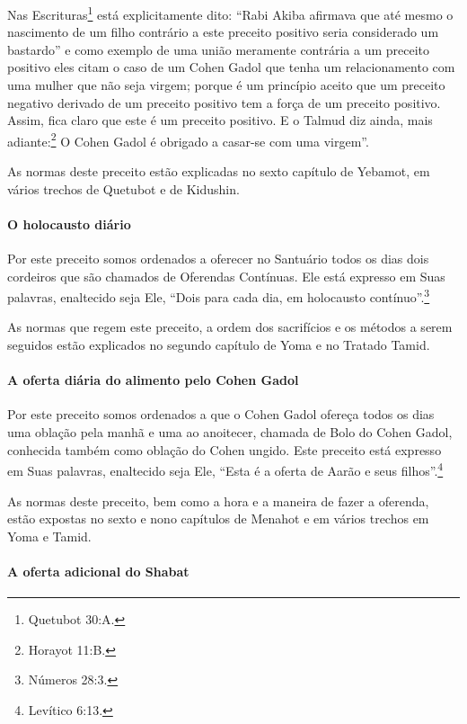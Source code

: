 Nas Escrituras\footnote{Quetubot 30:A.} está explicitamente dito: ``Rabi
Akiba afirmava que até mesmo o nascimento de um filho contrário a este
preceito positivo seria considerado um bastardo'' e como exemplo de uma
união meramente contrária a um preceito positivo eles citam o caso de um
Cohen Gadol que tenha um relacionamento com uma mulher que não seja
virgem; porque é um princípio aceito que um preceito negativo derivado
de um preceito positivo tem a força de um preceito positivo. Assim, fica
claro que este é um preceito positivo. E o Talmud diz ainda, mais
adiante:\footnote{Horayot 11:B.} O Cohen Gadol é obrigado a casar-se com
uma virgem''.

As normas deste preceito estão explicadas no sexto capítulo de Yebamot,
em vários trechos de Quetubot e de Kidushin.

\paragraph{O holocausto diário}

Por este preceito somos ordenados a oferecer no Santuário todos os dias
dois cordeiros que são chamados de Oferendas Contínuas. Ele está
expresso em Suas palavras, enaltecido seja Ele, ``Dois para cada dia,
em holocausto contínuo''.\footnote{Números 28:3.}

As normas que regem este preceito, a ordem dos sacrifícios e os métodos
a serem seguidos estão explicados no segundo capítulo de Yoma e no
Tratado Tamid.

\paragraph{A oferta diária do alimento pelo Cohen Gadol}

Por este preceito somos ordenados a que o Cohen Gadol ofereça todos
os dias uma oblação pela manhã e uma ao anoitecer, chamada de Bolo
do Cohen Gadol, conhecida também como oblação do Cohen ungido.
Este preceito está expresso em Suas palavras, enaltecido seja Ele,
``Esta é a oferta de Aarão e seus filhos''.\footnote{Levítico 6:13.}

As normas deste preceito, bem como a hora e a maneira de fazer a
oferenda, estão expostas no sexto e nono capítulos de Menahot e em
vários trechos em Yoma e Tamid.

\paragraph{A oferta adicional do Shabat}

